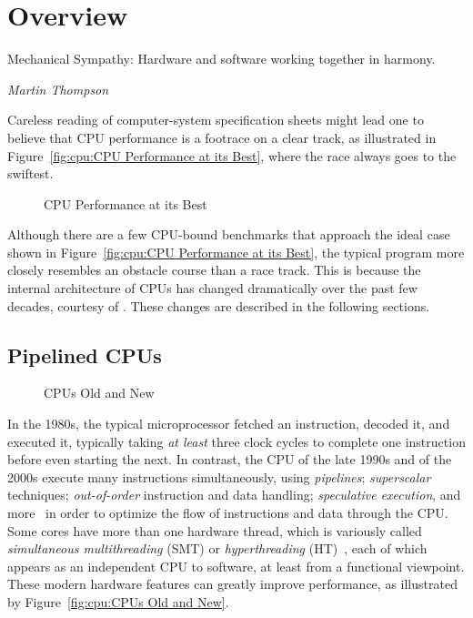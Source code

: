 
\section{Overview}
\label{sec:cpu:Overview}
%
\epigraph{Mechanical Sympathy: Hardware and software working together in
	  harmony.}{\emph{Martin Thompson}}

Careless reading of computer-system specification sheets might lead one
to believe that CPU performance is a footrace on a clear track, as
illustrated in Figure~\ref{fig:cpu:CPU Performance at its Best},
where the race always goes to the swiftest.

\begin{figure}
\centering
{}
\caption{CPU Performance at its Best}
\end{figure}

Although there are a few CPU-bound benchmarks that approach the ideal case
shown in Figure~\ref{fig:cpu:CPU Performance at its Best},
the typical program more closely resembles an obstacle course than
a race track.
This is because the internal architecture of CPUs has changed dramatically
over the past few decades, courtesy of .
These changes are described in the following sections.

\subsection{Pipelined CPUs}
\label{sec:cpu:Pipelined CPUs}

\begin{figure}
\centering
{}
\caption{CPUs Old and New}
\end{figure}

In the 1980s, the typical microprocessor fetched an instruction, decoded
it, and executed it, typically taking \emph{at least} three clock cycles
to complete one instruction before even starting the next.
In contrast, the CPU of the late 1990s and of the 2000s execute many
instructions simultaneously, using \emph{pipelines}; \emph{superscalar}
techniques; \emph{out-of-order} instruction and data handling;
\emph{speculative execution}, and
more~\cite{Hennessy2017,Hennessy2011}
in order to optimize the flow of instructions and data through the CPU\@.
Some cores have more than one hardware thread, which is variously called
\emph{simultaneous multithreading} (SMT) or \emph{hyperthreading}
(HT)~\cite{JFennel1973SMT},
each of which appears as
an independent CPU to software, at least from a functional viewpoint.
These modern hardware features can greatly improve performance, as
illustrated by Figure~\ref{fig:cpu:CPUs Old and New}.

